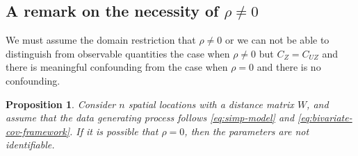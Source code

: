 \documentclass[11pt]{article}
\newtheorem{proposition}{Proposition}
\theoremstyle{definition}
\theoremstyle{remark}
\begin{document}
\subsection{A remark on the necessity of $\rho \neq 0$} 
We must assume the domain restriction that $\rho \neq 0$ or we can not be able to distinguish from observable quantities the case when $\rho \neq 0$ but $C_Z = C_{UZ}$ and there is meaningful confounding from the case when $\rho = 0$ and there is no confounding.

\begin{proposition}\label{prop:bivariate-flexible-rho-zero-nonid}
Consider $n$ spatial locations with a distance matrix $W$, 
and assume that the data generating process follows \eqref{eq:simp-model} and \eqref{eq:bivariate-cov-framework}. If it is possible that $\rho = 0$, then the parameters are not identifiable.
\end{proposition}
\end{document}
